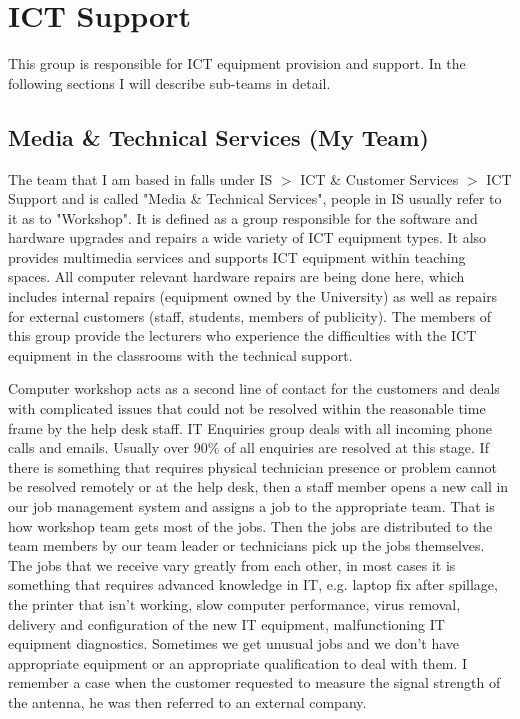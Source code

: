 \documentclass[10pt,a4paper,headinclude=true,twoside]{report}
\begin{document}
\section{ICT Support}
This group is responsible for ICT equipment provision and support. In the following sections I will describe sub-teams in detail.
\subsection{Media \& Technical Services (My Team)}
The team that I am based in falls under IS $>$ ICT \& Customer Services $>$ ICT Support and is called "Media \& Technical Services", people in IS usually refer to it as to "Workshop". It is defined as a group responsible for the software and hardware upgrades and repairs a wide variety of ICT equipment types. It also provides multimedia services and supports ICT equipment within teaching spaces. All computer relevant hardware repairs are being done here, which includes internal repairs (equipment owned by the University) as well as repairs for external customers (staff, students, members of publicity). The members of this group provide the lecturers who experience the difficulties with the ICT equipment in the classrooms with the technical support. 

Computer workshop acts as a second line of contact for the customers and deals with complicated issues that could not be resolved within the reasonable time frame by the help desk staff. IT Enquiries group deals with all incoming phone calls and emails. Usually over 90\% of all enquiries are resolved at this stage. If there is something that requires physical technician presence or problem cannot be resolved remotely or at the help desk, then a staff member opens a new call in our job management system and assigns a job to the appropriate team. That is how workshop team gets most of the jobs. Then the jobs are distributed to the team members by our team leader or technicians pick up the jobs themselves. The jobs that we receive vary greatly from each other, in most cases it is something that requires advanced knowledge in IT, e.g. laptop fix after spillage, the printer that isn't working, slow computer performance, virus removal, delivery and configuration of the new IT equipment, malfunctioning IT equipment diagnostics. Sometimes we get unusual jobs and we don't have appropriate equipment or an appropriate qualification to deal with them. I remember a case when the customer requested to measure the signal strength of the antenna, he was then referred to an external company.
\end{document}
